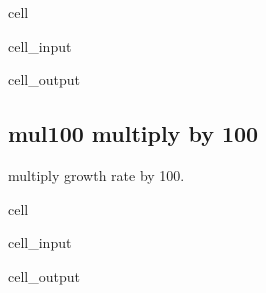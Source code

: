 \documentclass[letterpaper,10pt,english]{jupyterBook}
\begin{document}
\begin{sphinxuseclass}{cell}\begin{sphinxVerbatimInput}

\begin{sphinxuseclass}{cell_input}
\begin{sphinxVerbatim}[commandchars=\\\{\}]
\PYG{p}{[}\PYG{p}{]}  
\end{sphinxVerbatim}

\end{sphinxuseclass}\end{sphinxVerbatimInput}
\begin{sphinxVerbatimOutput}

\begin{sphinxuseclass}{cell_output}
\noindent{}

\end{sphinxuseclass}\end{sphinxVerbatimOutput}

\end{sphinxuseclass}

\subsection{mul100 multiply by 100}
\label{\detokenize{content/Python/modelflow_features:mul100-multiply-by-100}}
\sphinxAtStartPar
multiply growth rate by 100.

\begin{sphinxuseclass}{cell}\begin{sphinxVerbatimInput}

\begin{sphinxuseclass}{cell_input}
\begin{sphinxVerbatim}[commandchars=\\\{\}]
\PYG{p}{[}\PYG{p}{]} 
\end{sphinxVerbatim}

\end{sphinxuseclass}\end{sphinxVerbatimInput}
\begin{sphinxVerbatimOutput}

\begin{sphinxuseclass}{cell_output}
\noindent{}

\noindent{}

\end{sphinxuseclass}\end{sphinxVerbatimOutput}

\end{sphinxuseclass}
\end{document}
